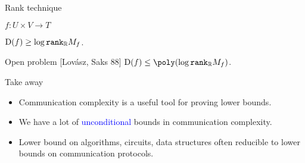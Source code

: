 \begin{frame}{Rank technique}

    $f: U \times V \to T$

    \begin{center}
                
    \end{center}

    \begin{lemma}
        $\mathrm{D}(f) \ge \log \mathtt{rank}_{\mathbb{R}} M_f$.
    \end{lemma}

    \begin{block}{Open problem [Lov{\'{a}}sz, Saks 88]}
        $\DCC(f) \le \poly(\log \mathtt{rank}_{\mathbb{R}} M_f)$.
    \end{block}
\end{frame}

\begin{frame}{Take away}

    \begin{itemize}
        \item Communication complexity is a useful tool for proving lower bounds.
        \item We have a lot of \textcolor{blue}{unconditional} bounds in communication complexity.
        \item Lower bound on algorithms, circuits, data structures often reducible to lower bounds on
            communication protocols.
    \end{itemize}
\end{frame}